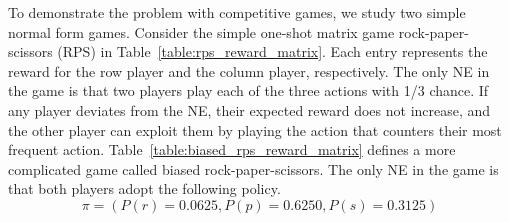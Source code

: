 \documentclass[]{interact}
\theoremstyle{plain}%
\theoremstyle{definition}
\theoremstyle{remark}
\begin{document}
\begin{table}
    \begin{minipage}{0.5\textwidth}
    \label{table:rps_reward_matrix}
    \end{minipage}
    \begin{minipage}{0.5\textwidth}
    \label{table:biased_rps_reward_matrix}
    \end{minipage}
\end{table}

To demonstrate the problem with competitive games, we study two simple normal form games. Consider the simple one-shot matrix game rock-paper-scissors (RPS) in Table~\ref{table:rps_reward_matrix}. Each entry represents the reward for the row player and the column player, respectively. The only NE in the game is that two players play each of the three actions with 1/3 chance. If any player deviates from the NE, their expected reward does not increase, and the other player can exploit them by playing the action that counters their most frequent action. Table~\ref{table:biased_rps_reward_matrix} defines a more complicated game called biased rock-paper-scissors. The only NE in the game is that both players adopt the following policy.
\begin{equation}
    \pi=(P(r)=0.0625,P(p)=0.6250,P(s)=0.3125)
    \label{eq:biased_rps_policy}
\end{equation}
\end{document}
